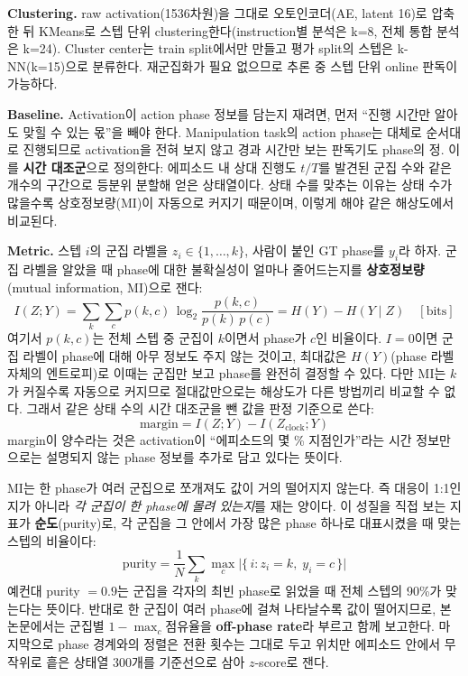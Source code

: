 \documentclass[a4paper,twocolumn,9pt]{extarticle}
\begin{document}
\textbf{Clustering.} raw activation(1536차원)을 그대로 오토인코더(AE, latent 16)로 압축한 뒤 KMeans로 스텝 단위 clustering한다(instruction별 분석은 k=8, 전체 통합 분석은 k=24). Cluster center는 train split에서만 만들고 평가 split의 스텝은 k-NN(k=15)으로 분류한다. 재군집화가 필요 없으므로 추론 중 스텝 단위 online 판독이 가능하다.

\textbf{Baseline.} Activation이 action phase 정보를 담는지 재려면, 먼저 ``진행 시간만 알아도 맞힐 수 있는 몫''을 빼야 한다. Manipulation task의 action phase는 대체로 순서대로 진행되므로 activation을 전혀 보지 않고 경과 시간만 보는 판독기도 phase의 정. 이를 \textbf{시간 대조군}으로 정의한다: 에피소드 내 상대 진행도 $t/T$를 발견된 군집
수와 같은 개수의 구간으로 등분위 분할해 얻은 상태열이다. 상태 수를 맞추는 이유는 상태
수가 많을수록 상호정보량(MI)이 자동으로 커지기 때문이며, 이렇게 해야 같은 해상도에서
비교된다.

\textbf{Metric.} 스텝 $i$의 군집 라벨을 $z_i \in \{1,\dots,k\}$, 사람이 붙인 GT
phase를 $y_i$라 하자. 군집 라벨을 알았을 때 phase에 대한 불확실성이 얼마나 줄어드는지를
\textbf{상호정보량}(mutual information, MI)으로 잰다:
%
\begin{equation}
I(Z;Y)=\sum_{k}\sum_{c} p(k,c)\,\log_2\frac{p(k,c)}{p(k)\,p(c)}
      = H(Y)-H(Y\mid Z) \quad [\text{bits}]
\label{eq:mi}
\end{equation}
%
여기서 $p(k,c)$는 전체 스텝 중 군집이 $k$이면서 phase가 $c$인 비율이다. $I=0$이면 군집
라벨이 phase에 대해 아무 정보도 주지 않는 것이고, 최대값은 $H(Y)$(phase 라벨 자체의
엔트로피)로 이때는 군집만 보고 phase를 완전히 결정할 수 있다. 다만 MI는 $k$가 커질수록
자동으로 커지므로 절대값만으로는 해상도가 다른 방법끼리 비교할 수 없다. 그래서 같은
상태 수의 시간 대조군을 뺀 값을 판정 기준으로 쓴다:
%
\begin{equation}
\mathrm{margin} = I(Z;Y) - I(Z_{\mathrm{clock}};Y)
\label{eq:margin}
\end{equation}
%
margin이 양수라는 것은 activation이 ``에피소드의 몇 \% 지점인가''라는 시간 정보만으로는
설명되지 않는 phase 정보를 추가로 담고 있다는 뜻이다.

MI는 한 phase가 여러 군집으로 쪼개져도 값이 거의 떨어지지 않는다. 즉 대응이 1:1인지가
아니라 \emph{각 군집이 한 phase에 몰려 있는지}를 재는 양이다. 이 성질을 직접 보는 지표가
\textbf{순도}(purity)로, 각 군집을 그 안에서 가장 많은 phase 하나로 대표시켰을 때 맞는
스텝의 비율이다:
%
\begin{equation}
\mathrm{purity}=\frac{1}{N}\sum_{k}\max_{c} \bigl| \{\, i : z_i=k,\; y_i=c \,\}\bigr|
\label{eq:purity}
\end{equation}
%
예컨대 purity $=0.9$는 군집을 각자의 최빈 phase로 읽었을 때 전체 스텝의 90\%가 맞는다는
뜻이다. 반대로 한 군집이 여러 phase에 걸쳐 나타날수록 값이 떨어지므로, 본 논문에서는
군집별 $1-\max_c$점유율을 \textbf{off-phase rate}라 부르고 함께 보고한다. 마지막으로
phase 경계와의 정렬은 전환 횟수는 그대로 두고 위치만 에피소드 안에서 무작위로 흩은
상태열 300개를 기준선으로 삼아 $z$-score로 잰다.
\end{document}
